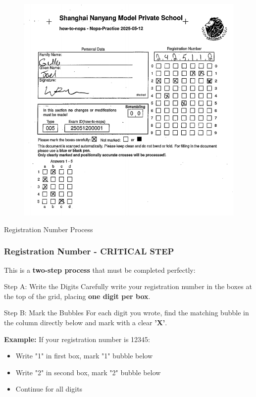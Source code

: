\documentclass{beamer}
\begin{document}
\begin{frame}

\begin{figure}
    \centering
    \includegraphics[width=0.5\linewidth]{scannops.png}
\end{figure}
\end{frame}

\begin{frame}{Registration Number Process}
\frametitle{Registration Number - CRITICAL STEP}
This is a \textbf{two-step process} that must be completed perfectly:

\begin{block}{Step A: Write the Digits}
Carefully write your registration number in the boxes at the top of the grid, placing \textbf{one digit per box}.
\end{block}

\begin{block}{Step B: Mark the Bubbles}
For each digit you wrote, find the matching bubble in the column directly below and mark with a clear \textbf{'X'}.
\end{block}

\textbf{Example:} If your registration number is 12345:
\begin{itemize}
\item Write "1" in first box, mark "1" bubble below
\item Write "2" in second box, mark "2" bubble below
\item Continue for all digits
\end{itemize}
\end{frame}
\end{document}
